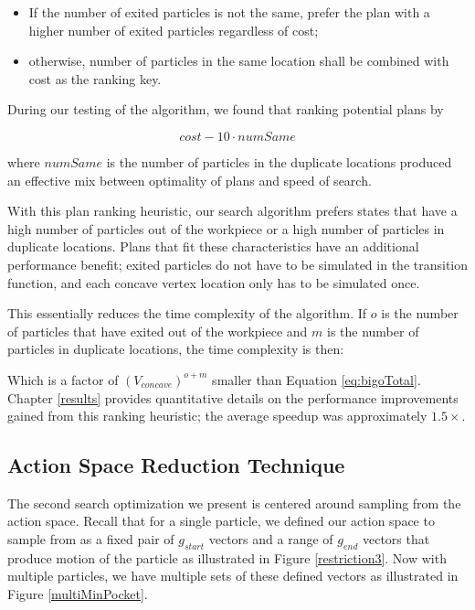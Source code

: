 \begin{itemize}
\item If the number of exited particles is not the same, prefer the plan with a higher number of exited particles regardless of cost;
\item otherwise, number of particles in the same location shall be combined with cost as the ranking key.
\end{itemize}

During our testing of the algorithm, we found that ranking potential plans by

$$
cost - 10 \cdot numSame
$$

where $numSame$ is the number of particles in the duplicate locations produced an effective mix between optimality of plans and speed of search.

With this plan ranking heuristic, our search algorithm prefers states that have a high number of particles out of the workpiece or a high number of particles in duplicate locations. Plans that fit these characteristics have an additional performance benefit; exited particles do not have to be simulated in the transition function, and each concave vertex location only has to be simulated once.

This essentially reduces the time complexity of the algorithm. If $o$ is the number of particles that have exited out of the workpiece and $m$ is the number of particles in duplicate locations, the time complexity is then:

 {
  \label{eq:bigoTotalWithHeuristic}
}

Which is a factor of $(V_{concave})^{o + m}$ smaller than Equation \eqref{eq:bigoTotal}. Chapter \ref{results} provides quantitative details on the performance improvements gained from this ranking heuristic; the average speedup was approximately $1.5 \times$.

\subsection{Action Space Reduction Technique}

The second search optimization we present is centered around sampling from the action space. Recall that for a single particle, we defined our action space to sample from as a fixed pair of $g_{start}$ vectors and a range of $g_{end}$ vectors that produce motion of the particle as illustrated in Figure \ref{restriction3}. Now with multiple particles, we have multiple sets of these defined vectors as illustrated in Figure \ref{multiMinPocket}.

